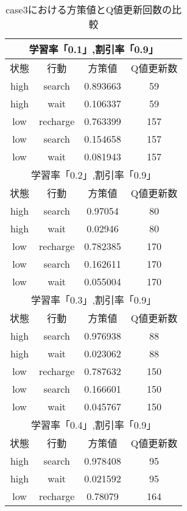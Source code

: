 \begin{table}[b]
  \centering
  \caption{case3における方策値とQ値更新回数の比較}
  \label{table:6}
  \begin{minipage}[!t]{0.45\hsize}
    \begin{tabular}{|c|c|c|c|}
      \hline
      \multicolumn{4}{|c|}{学習率「0.1」,割引率「0.9」} \\
      \hline
      状態 & 行動 & 方策値 & Q値更新数\\
      \hline
      high & search & 0.893663 & 59 \\
      high & wait & 0.106337 & 59 \\\hline
      low & recharge & 0.763399 & 157 \\
      low & search & 0.154658 & 157 \\
      low & wait & 0.081943 & 157 \\
      \hline
      \hline
      \multicolumn{4}{|c|}{学習率「0.2」,割引率「0.9」} \\
      \hline
      状態 & 行動 & 方策値 & Q値更新数\\
      \hline
      high & search & 0.97054 & 80 \\
      high & wait & 0.02946 & 80 \\\hline
      low & recharge & 0.782385 & 170 \\
      low & search & 0.162611 & 170 \\
      low & wait & 0.055004 & 170 \\
      \hline\hline
      \multicolumn{4}{|c|}{学習率「0.3」,割引率「0.9」} \\
      \hline
      状態 & 行動 & 方策値 & Q値更新数\\
      \hline
      high & search & 0.976938 & 88 \\
      high & wait & 0.023062 & 88 \\\hline
      low & recharge & 0.787632 & 150 \\
      low & search & 0.166601 & 150 \\
      low & wait & 0.045767 & 150 \\
      \hline\hline
      \multicolumn{4}{|c|}{学習率「0.4」,割引率「0.9」} \\
      \hline
      状態 & 行動 & 方策値 & Q値更新数\\
      \hline
      high & search & 0.978408 & 95 \\
      high & wait & 0.021592 & 95 \\\hline
      low & recharge & 0.78079 & 164 \\

\end{tabular}
\end{minipage}
\end{table}
